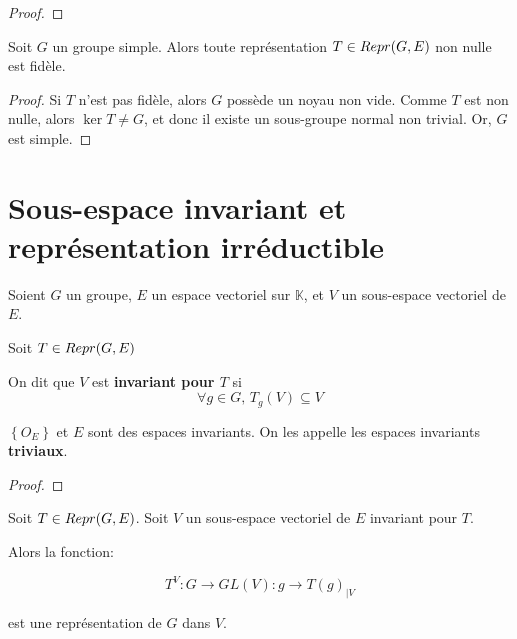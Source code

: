 \ifdefined\outputproof
\begin{proof}

\end{proof}
\fi

\begin{corollary}
	Soit $G$ un groupe simple. Alors toute représentation $T \in Repr(G, E)$
	non nulle est fidèle.
\end{corollary}

\ifdefined\outputproof
\begin{proof}
	Si $T$ n'est pas fidèle, alors $G$ possède un noyau non vide. Comme $T$ est
	non nulle, alors $\ker{T} \neq G$, et donc il existe un sous-groupe normal
	non trivial. Or, $G$ est simple.
\end{proof}
\fi

\section{Sous-espace invariant et représentation irréductible}

\begin{definition} 
	Soient $G$ un groupe, $E$ un espace vectoriel sur $\mathbb{K}$, et $V$ un sous-espace
	vectoriel de $E$.

	Soit $T \in Repr(G, E)$

	On dit que $V$ est \textbf{invariant pour $T$} si
	\begin{equation}
		\forall g \in G, \, T_{g}(V) \subseteq V
		\label{definition_invariant_subspace}
	\end{equation}
\end{definition}

\begin{proposition}
	$\left\{ O_{E} \right\}$ et $E$ sont des espaces invariants. On les appelle
	les espaces invariants \textbf{triviaux}.
\end{proposition}

\ifdefined\outputproof
\begin{proof}

\end{proof}
\fi

\begin{proposition}
	Soit $T \in Repr(G, E)$. Soit $V$ un sous-espace vectoriel de $E$
	invariant pour $T$.

	Alors la fonction:

	\begin{equation}
		T^{V} : G \rightarrow GL(V) : g \rightarrow T(g)_{|V}
	\end{equation}

	est une représentation de $G$ dans $V$.
\end{proposition}

